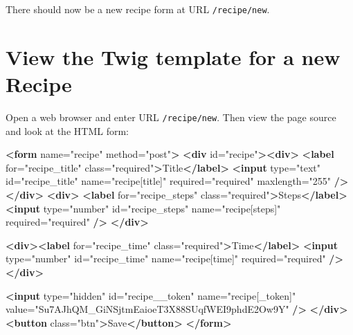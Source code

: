 \documentclass[a4paperpaper,openright]{book}
\newenvironment{Shaded}{}{}
\newcommand{\KeywordTok}[1]{\textcolor[rgb]{0.00,0.44,0.13}{\textbf{#1}}}
\newcommand{\NormalTok}[1]{#1}
\newcommand{\OtherTok}[1]{\textcolor[rgb]{0.00,0.44,0.13}{#1}}
\newcommand{\StringTok}[1]{\textcolor[rgb]{0.25,0.44,0.63}{#1}}
\begin{document}
There should now be a new recipe form at URL \texttt{/recipe/new}.

\hypertarget{view-the-twig-template-for-a-new-recipe}{%
\section{View the Twig template for a new
Recipe}\label{view-the-twig-template-for-a-new-recipe}}

Open a web browser and enter URL \texttt{/recipe/new}. Then view the
page source and look at the HTML form:

\begin{Shaded}
\begin{Highlighting}[]
\KeywordTok{<form}\OtherTok{ name=}\StringTok{"recipe"}\OtherTok{ method=}\StringTok{"post"}\KeywordTok{>}
    \KeywordTok{<div}\OtherTok{ id=}\StringTok{"recipe"}\KeywordTok{><div>}
    \KeywordTok{<label}\OtherTok{ for=}\StringTok{"recipe_title"}\OtherTok{ class=}\StringTok{"required"}\KeywordTok{>}\NormalTok{Title}\KeywordTok{</label>}
    \KeywordTok{<input}\OtherTok{ type=}\StringTok{"text"}\OtherTok{ id=}\StringTok{"recipe_title"}\OtherTok{ name=}\StringTok{"recipe[title]"}\OtherTok{ required=}\StringTok{"required"}\OtherTok{ maxlength=}\StringTok{"255"} \KeywordTok{/>}
    \KeywordTok{</div>}
    \KeywordTok{<div>}
    \KeywordTok{<label}\OtherTok{ for=}\StringTok{"recipe_steps"}\OtherTok{ class=}\StringTok{"required"}\KeywordTok{>}\NormalTok{Steps}\KeywordTok{</label>}
    \KeywordTok{<input}\OtherTok{ type=}\StringTok{"number"}\OtherTok{ id=}\StringTok{"recipe_steps"}\OtherTok{ name=}\StringTok{"recipe[steps]"}\OtherTok{ required=}\StringTok{"required"} \KeywordTok{/>}
    \KeywordTok{</div>}
    
    \KeywordTok{<div><label}\OtherTok{ for=}\StringTok{"recipe_time"}\OtherTok{ class=}\StringTok{"required"}\KeywordTok{>}\NormalTok{Time}\KeywordTok{</label>}
    \KeywordTok{<input}\OtherTok{ type=}\StringTok{"number"}\OtherTok{ id=}\StringTok{"recipe_time"}\OtherTok{ name=}\StringTok{"recipe[time]"}\OtherTok{ required=}\StringTok{"required"} \KeywordTok{/>}
    \KeywordTok{</div>}
    
    \KeywordTok{<input}\OtherTok{ type=}\StringTok{"hidden"}\OtherTok{ id=}\StringTok{"recipe__token"}\OtherTok{ name=}\StringTok{"recipe[_token]"}\OtherTok{ value=}\StringTok{"Su7AJhQM_GiNSjtmEaioeT3X88SUqfWEI9phdE2Ow9Y"} \KeywordTok{/>}
    \KeywordTok{</div>}
    \KeywordTok{<button}\OtherTok{ class=}\StringTok{"btn"}\KeywordTok{>}\NormalTok{Save}\KeywordTok{</button>}
\KeywordTok{</form>}
\end{Highlighting}
\end{Shaded}
\end{document}
